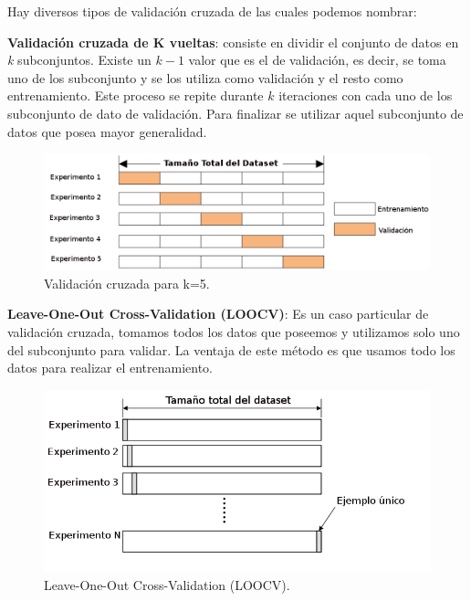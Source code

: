 Hay diversos tipos de validación cruzada de las cuales podemos nombrar:


\par \textbf{Validación cruzada de K vueltas}: consiste en dividir el conjunto de datos en \textit{k} subconjuntos. Existe un $k-1 $ valor que es el de validación, es decir, se toma uno de los subconjunto y se los utiliza como validación y el resto como entrenamiento.  Este proceso se repite durante $k $ iteraciones con cada uno de los subconjunto de dato de validación. Para finalizar se utilizar aquel subconjunto de datos que posea mayor generalidad.
\begin{figure}[H]
 \centering
  \includegraphics[scale=0.4,keepaspectratio=true,clip=true]{imagenes/MarcoTeorico/crossvalidat.png}
  \caption{Validación cruzada para k=5.}%
	\label{Fig: crossvalidation}
\end{figure}

\par \textbf{Leave-One-Out Cross-Validation (LOOCV)}: Es un caso particular de validación cruzada, tomamos todos los datos que poseemos y utilizamos solo uno del subconjunto para validar. La ventaja de este método es que usamos todo los datos para realizar el entrenamiento.

\begin{figure}[H]
 \centering
  \includegraphics[scale=0.4,keepaspectratio=true,clip=true]{imagenes/MarcoTeorico/cross-validation-LOOCV.png}
  \caption{Leave-One-Out Cross-Validation (LOOCV).}%
	\label{Fig: crossvalidation-LOOCV}
\end{figure}

